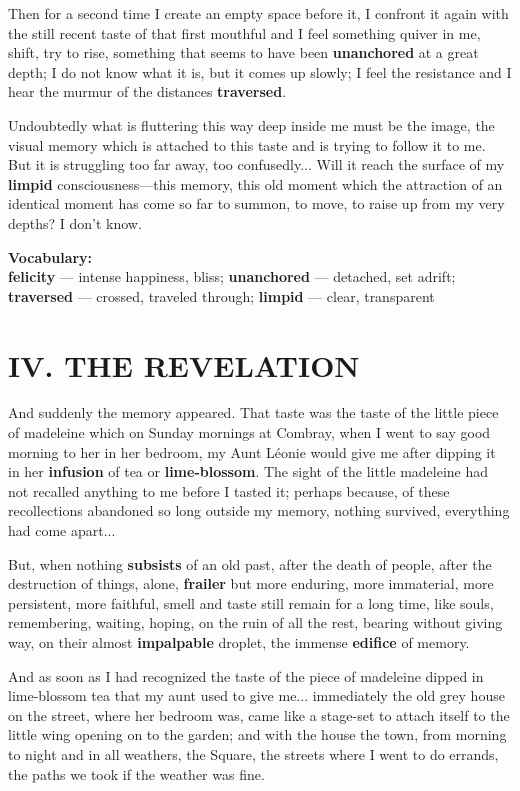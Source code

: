 \documentclass[11pt, a4paper]{article}
\begin{document}
Then for a second time I create an empty space before it, I confront it again with the still recent taste of that first mouthful and I feel something quiver in me, shift, try to rise, something that seems to have been \textbf{unanchored} at a great depth; I do not know what it is, but it comes up slowly; I feel the resistance and I hear the murmur of the distances \textbf{traversed}. 

Undoubtedly what is fluttering this way deep inside me must be the image, the visual memory which is attached to this taste and is trying to follow it to me. But it is struggling too far away, too confusedly... Will it reach the surface of my \textbf{limpid} consciousness—this memory, this old moment which the attraction of an identical moment has come so far to summon, to move, to raise up from my very depths? I don’t know.

\medskip
\noindent\textbf{Vocabulary:}\\
\textbf{felicity} — intense happiness, bliss; \textbf{unanchored} — detached, set adrift; \textbf{traversed} — crossed, traveled through; \textbf{limpid} — clear, transparent

\section*{IV. THE REVELATION}

And suddenly the memory appeared. That taste was the taste of the little piece of madeleine which on Sunday mornings at Combray, when I went to say good morning to her in her bedroom, my Aunt Léonie would give me after dipping it in her \textbf{infusion} of tea or \textbf{lime-blossom}. The sight of the little madeleine had not recalled anything to me before I tasted it; perhaps because, of these recollections abandoned so long outside my memory, nothing survived, everything had come apart...

But, when nothing \textbf{subsists} of an old past, after the death of people, after the destruction of things, alone, \textbf{frailer} but more enduring, more immaterial, more persistent, more faithful, smell and taste still remain for a long time, like souls, remembering, waiting, hoping, on the ruin of all the rest, bearing without giving way, on their almost \textbf{impalpable} droplet, the immense \textbf{edifice} of memory.

And as soon as I had recognized the taste of the piece of madeleine dipped in lime-blossom tea that my aunt used to give me... immediately the old grey house on the street, where her bedroom was, came like a stage-set to attach itself to the little wing opening on to the garden; and with the house the town, from morning to night and in all weathers, the Square, the streets where I went to do errands, the paths we took if the weather was fine. 
\end{document}

